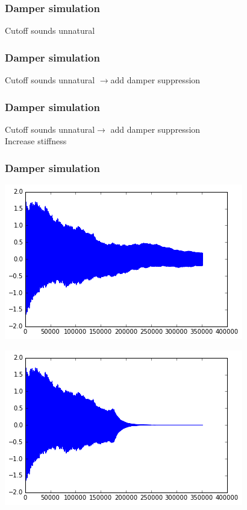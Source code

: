 \documentclass{beamer}
\begin{document}
\begin{frame}\frametitle{Damper simulation}
Cutoff sounds unnatural
\end{frame}

\begin{frame}\frametitle{Damper simulation}
Cutoff sounds unnatural $\rightarrow$add damper suppression
\end{frame}

\begin{frame}\frametitle{Damper simulation}
Cutoff sounds unnatural$\rightarrow$ add damper suppression\\
Increase stiffness
\end{frame}

\begin{frame}\frametitle{Damper simulation}

    \begin{minipage}{0.47\textwidth}
		\includegraphics[width=\textwidth]{images/normal.png}
	\end{minipage}
    \begin{minipage}{0.47\textwidth}
		\includegraphics[width=\textwidth]{images/damped.png}
	\end{minipage}
\end{frame}
\end{document}
